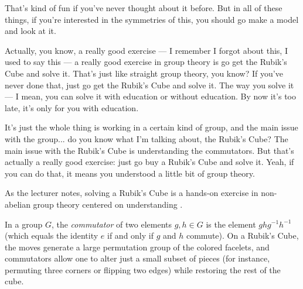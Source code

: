 \begin{speech}[00:29:42 - 00:30:40]
That's kind of fun if you've never thought about it before. But in all of these things, if you're interested in the symmetries of this, you should go make a model and look at it.

Actually, you know, a really good exercise --- I remember I forgot about this, I used to say this --- a really good exercise in group theory is go get the Rubik's Cube and solve it. That's just like straight group theory, you know? If you've never done that, just go get the Rubik's Cube and solve it. The way you solve it --- I mean, you can solve it with education or without education. By now it's too late, it's only for you with education.

It's just the whole thing is working in a certain kind of group, and the main issue with the group... do you know what I'm talking about, the Rubik's Cube? The main issue with the Rubik's Cube is understanding the commutators. But that's actually a really good exercise: just go buy a Rubik's Cube and solve it. Yeah, if you can do that, it means you understood a little bit of group theory.
\end{speech}

\begin{insight}
As the lecturer notes, solving a Rubik's Cube is a hands-on exercise in non-abelian group theory centered on understanding .
\end{insight}

\begin{aiNote}
In a group $G$, the \emph{commutator} of two elements $g, h \in G$ is the element $g h g^{-1} h^{-1}$ (which equals the identity $e$ if and only if $g$ and $h$ commute). On a Rubik's Cube, the moves generate a large permutation group of the colored facelets, and commutators allow one to alter just a small subset of pieces (for instance, permuting three corners or flipping two edges) while restoring the rest of the cube.
\end{aiNote}

\begin{hidden}
\end{hidden}

